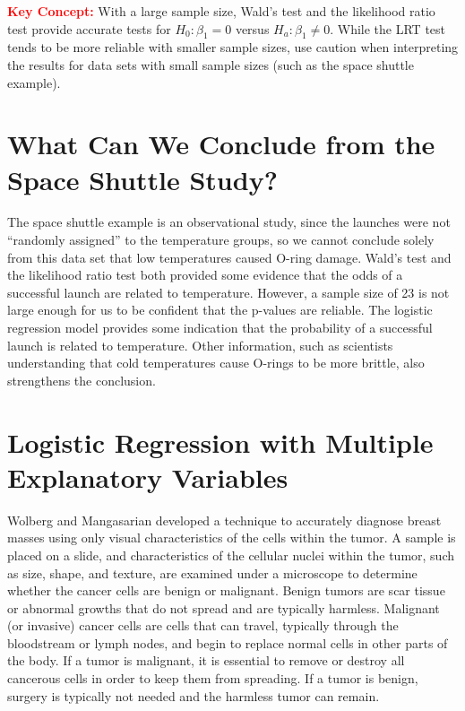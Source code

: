 \documentclass[
]{report}
\begin{document}
\Large

\textbf{\textcolor{red}{Key Concept:}}
\color{red}
With a large sample size, Wald's test and the likelihood ratio test provide accurate tests for \(H_0: \beta_1 = 0\) versus \(H_a: \beta_1 \neq 0\). While the LRT test tends to be more reliable with smaller sample sizes, use caution when interpreting the results for data sets with small sample sizes (such as the space shuttle example).
\color{black}
\normalsize

\section{\texorpdfstring{\textbf{What Can We Conclude from the Space Shuttle Study?}}{What Can We Conclude from the Space Shuttle Study?}}\label{what-can-we-conclude-from-the-space-shuttle-study}

The space shuttle example is an observational study, since the launches were not ``randomly assigned'' to the temperature groups, so we cannot conclude solely from this data set that low temperatures caused O-ring damage. Wald's test and the likelihood ratio test both provided some evidence that the odds of a successful launch are related to temperature. However, a sample size of 23 is not large enough for us to be confident that the p-values are reliable. The logistic regression model provides some indication that the probability of a successful launch is related to temperature. Other information, such as scientists understanding that cold temperatures cause O-rings to be more brittle, also strengthens the conclusion.

\section{\texorpdfstring{\textbf{Logistic Regression with Multiple Explanatory Variables}}{Logistic Regression with Multiple Explanatory Variables}}\label{logistic-regression-with-multiple-explanatory-variables}

Wolberg and Mangasarian developed a technique to accurately diagnose breast masses using only visual characteristics of the cells within the tumor. A sample is placed on a slide, and characteristics of the cellular nuclei within the tumor, such as size, shape, and texture, are examined under a microscope to determine whether the cancer cells are benign or malignant. Benign tumors are scar tissue or abnormal growths that do not spread and are typically harmless. Malignant (or invasive) cancer cells are cells that can travel, typically through the bloodstream or lymph nodes, and begin to replace normal cells in other parts of the body. If a tumor is malignant, it is essential to remove or destroy all cancerous cells in order to keep them from spreading. If a tumor is benign, surgery is typically not needed and the harmless tumor can remain.
\end{document}
